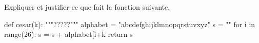 Expliquer et justifier ce que fait la fonction suivante. 
\begin{pyverbatim}
def cesar(k):
    """?????"""
    alphabet = "abcdefghijklmnopqrstuvxyz"
    s = ""
    for i in range(26):
        s = s + alphabet[i+k %
    return s
\end{pyverbatim}
